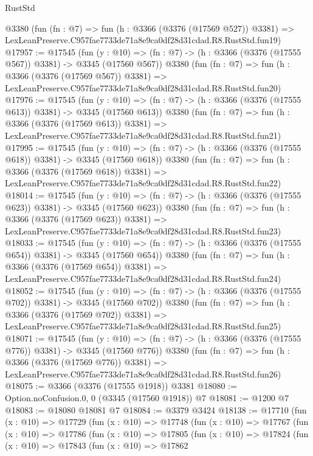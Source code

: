 \begin{lexlean}{RustStd}
\begin{coremodule}
    @3380
    (fun (fn : @7) =>
    fun (h : @3366 (@3376 (@17569 @527)) @3381) =>
    LexLeanPreserve.C957fae7733de71a8e9ca0df28d31cdad.R8.RustStd.fun19)
@17957 := @17545
    (fun (y : @10) => (fn : @7) -> (h : @3366 (@3376 (@17555 @567)) @3381) -> @3345 (@17560 @567))
    @3380
    (fun (fn : @7) =>
    fun (h : @3366 (@3376 (@17569 @567)) @3381) =>
    LexLeanPreserve.C957fae7733de71a8e9ca0df28d31cdad.R8.RustStd.fun20)
@17976 := @17545
    (fun (y : @10) => (fn : @7) -> (h : @3366 (@3376 (@17555 @613)) @3381) -> @3345 (@17560 @613))
    @3380
    (fun (fn : @7) =>
    fun (h : @3366 (@3376 (@17569 @613)) @3381) =>
    LexLeanPreserve.C957fae7733de71a8e9ca0df28d31cdad.R8.RustStd.fun21)
@17995 := @17545
    (fun (y : @10) => (fn : @7) -> (h : @3366 (@3376 (@17555 @618)) @3381) -> @3345 (@17560 @618))
    @3380
    (fun (fn : @7) =>
    fun (h : @3366 (@3376 (@17569 @618)) @3381) =>
    LexLeanPreserve.C957fae7733de71a8e9ca0df28d31cdad.R8.RustStd.fun22)
@18014 := @17545
    (fun (y : @10) => (fn : @7) -> (h : @3366 (@3376 (@17555 @623)) @3381) -> @3345 (@17560 @623))
    @3380
    (fun (fn : @7) =>
    fun (h : @3366 (@3376 (@17569 @623)) @3381) =>
    LexLeanPreserve.C957fae7733de71a8e9ca0df28d31cdad.R8.RustStd.fun23)
@18033 := @17545
    (fun (y : @10) => (fn : @7) -> (h : @3366 (@3376 (@17555 @654)) @3381) -> @3345 (@17560 @654))
    @3380
    (fun (fn : @7) =>
    fun (h : @3366 (@3376 (@17569 @654)) @3381) =>
    LexLeanPreserve.C957fae7733de71a8e9ca0df28d31cdad.R8.RustStd.fun24)
@18052 := @17545
    (fun (y : @10) => (fn : @7) -> (h : @3366 (@3376 (@17555 @702)) @3381) -> @3345 (@17560 @702))
    @3380
    (fun (fn : @7) =>
    fun (h : @3366 (@3376 (@17569 @702)) @3381) =>
    LexLeanPreserve.C957fae7733de71a8e9ca0df28d31cdad.R8.RustStd.fun25)
@18071 := @17545
    (fun (y : @10) => (fn : @7) -> (h : @3366 (@3376 (@17555 @776)) @3381) -> @3345 (@17560 @776))
    @3380
    (fun (fn : @7) =>
    fun (h : @3366 (@3376 (@17569 @776)) @3381) =>
    LexLeanPreserve.C957fae7733de71a8e9ca0df28d31cdad.R8.RustStd.fun26)
@18075 := @3366 (@3376 (@17555 @1918)) @3381
@18080 := Option.noConfusion.{0, 0} (@3345 (@17560 @1918)) @7
@18081 := @1200 @7
@18083 := @18080 @18081 @7
@18084 := @3379 @3424
@18138 := @17710
    (fun (x : @10) =>
    @17729
      (fun (x : @10) =>
      @17748
        (fun (x : @10) =>
        @17767
          (fun (x : @10) =>
          @17786
            (fun (x : @10) =>
            @17805
              (fun (x : @10) =>
              @17824
                (fun (x : @10) =>
                @17843
                  (fun (x : @10) =>
                  @17862

\end{coremodule}
\end{lexlean}

